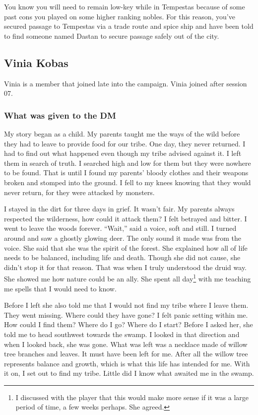 You know you will need to remain low-key while in Tempestas because of some past cons you played on some higher ranking nobles. For this reason, you've secured passage to Tempestas via a trade route and spice ship and have been told to find someone named Dastan to secure passage safely out of the city. 

\subsection{Vinia Kobas}

Vinia is a member that joined late into the campaign. Vinia joined after session 07.

\subsubsection{What was given to the DM}

My story began as a child. My parents taught me the ways of the wild before they had to leave to provide food for our tribe. One day, they never returned. I had to find out what happened even though my tribe advised against it. I left them in search of truth. I searched high and low for them but they were nowhere to be found. That is until I found my parents’ bloody clothes and their weapons broken and stomped into the ground. I fell to my knees knowing that they would never return, for they were attacked by monsters. 
	
I stayed in the dirt for three days in grief. It wasn't fair. My parents always respected the wilderness, how could it attack them? I felt betrayed and bitter. I went to leave the woods forever. “Wait,” said a voice, soft and still. I turned around and saw a ghostly glowing deer. The only sound it made was from the voice. She said that she was the spirit of the forest. She explained how all of life needs to be balanced, including life and death. Though she did not cause, she didn't stop it for that reason. That was when I truly understood the druid way. She showed me how nature could be an ally. She spent all day\footnote{I discussed with the player that this would make more sense if it was a large period of time, a few weeks perhaps. She agreed.} with me teaching me spells that I would need to know. 

Before I left she also told me that I would not find my tribe where I leave them. They went missing. Where could they have gone? I felt panic setting within me. How could I find them? Where do I go? Where do I start? Before I asked her, she told me to head southwest towards the swamp. I looked in that direction and when I looked back, she was gone. What was left was a necklace made of willow tree branches and leaves. It must have been left for me. After all the willow tree represents balance and growth, which is what this life has intended for me. With it on, I set out to find my tribe. Little did I know what awaited me in the swamp.

